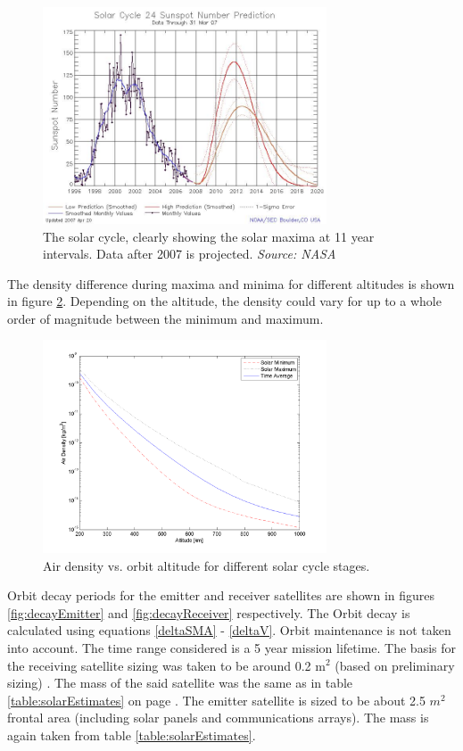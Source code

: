 \begin{figure}[ht!]
\centering
\includegraphics[width=0.75\textwidth, angle=0]{chapters/img/solarCycle.jpg}
\caption{The solar cycle, clearly showing the solar maxima at 11 year intervals. Data after 2007 is projected. \emph{Source: NASA} }
\label{fig:solarCycle}
\end{figure}

The density difference during maxima and minima for different altitudes is shown in figure \ref{fig:densityProfile}. Depending on the altitude, the density could vary for up to a whole order of magnitude between the minimum and maximum.

\begin{figure}[ht!]
\centering
\includegraphics[width=0.75\textwidth, angle=0]{chapters/img/densityAltitude.png}
\caption{Air density vs. orbit altitude for different solar cycle stages.}
\label{fig:densityProfile}
\end{figure}

Orbit decay periods for the emitter and receiver satellites are shown in figures \ref{fig:decayEmitter} and \ref{fig:decayReceiver} respectively. The Orbit decay is calculated using equations \ref{deltaSMA} - \ref{deltaV}. Orbit maintenance is not taken into account. The time range considered is a 5 year mission lifetime. The basis for the receiving satellite sizing was taken to be around 0.2 m$^2$ (based on preliminary sizing) . The mass of the said satellite was the same as in table \ref{table:solarEstimates} on page \pageref{table:solarEstimates}. The emitter satellite is sized to be about 2.5 $m^2$ frontal area (including solar panels and communications arrays). The mass is again taken from table \ref{table:solarEstimates}.


